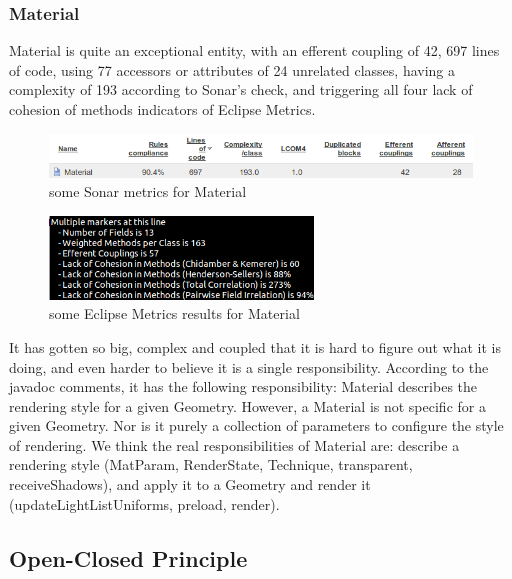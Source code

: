 \documentclass[a4paper, 10pt]{article}
\begin{document}
\subsubsection{Material}
Material is quite an exceptional entity,
with an efferent coupling of 42,
697 lines of code,
using 77 accessors or attributes of 24 unrelated classes,
having a complexity of 193 according to Sonar's check, and
triggering all four lack of cohesion of methods indicators of Eclipse Metrics.

\begin{figure}[htb!]
\centering
\includegraphics[width=\textwidth]{figures/material-sonar.png}
\vspace{-20pt}
\caption{some Sonar metrics for Material}
\label{fig:material-sonar}
\end{figure}
\vspace{-20pt}
\begin{figure}[htb!]
\centering
\includegraphics[width=70mm]{figures/material-metrics.png}
\vspace{-10pt}
\caption{some Eclipse Metrics results for Material}
\label{fig:material-metrics}
\end{figure}

It has gotten so big, complex and coupled that it is hard to 
figure out what it is doing, and even harder to believe
it is a single responsibility.
According to the javadoc comments, 
it has the following responsibility:
Material describes the rendering style for a given Geometry.
However, a Material is not specific for a given Geometry.
Nor is it purely a collection of parameters to configure
the style of rendering.
We think the real responsibilities of Material are:
describe a rendering style 
(MatParam, RenderState, Technique, transparent, receiveShadows),
and apply it to a Geometry and render it
(updateLightListUniforms, preload, render).

\subsection{Open-Closed Principle}%
\label{sec:lsp_violation} %
\end{document}
